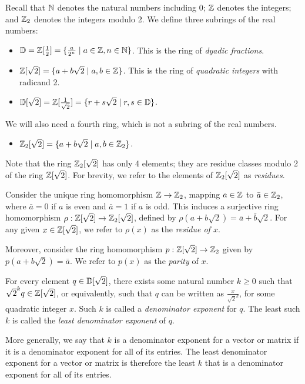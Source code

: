 \begin{definition}
  Recall that $\mathbb{N}$ denotes the natural numbers including 0; $\mathbb{Z}$ denotes the integers; and $\mathbb{Z}_2$
  denotes the integers modulo 2. We define three subrings of the real numbers:
  \begin{itemize}
    \item $\mathbb{D} = \mathbb{Z}[\frac12] = \{\frac{a}{2^n}\mid a\in\mathbb{Z},
        n\in\mathbb{N}\}$. This is the ring of {\em dyadic fractions}.
    \item $\mathbb{Z}[\sqrt{2}] = \{a+b\sqrt 2 \mid a,b\in\mathbb{Z}\}$. This is the ring of {\em
        quadratic integers} with radicand 2.
    \item $\mathbb{D}[\sqrt{2}] = \mathbb{Z}[\frac1{\sqrt2}] = \{r+s\sqrt 2 \mid r,s\in\mathbb{D}\}$.
  \end{itemize}
  We will also need a fourth ring, which is not a subring of the real numbers.
  \begin{itemize}
    \item $\mathbb{Z}_2[\sqrt{2}] = \{a+b\sqrt 2 \mid a,b\in\mathbb{Z}_2\}$.
  \end{itemize}
  Note that the ring $\mathbb{Z}_2[\sqrt{2}]$ has only 4 elements; they are residue classes modulo 2 of the ring
  $\mathbb{Z}[\sqrt 2]$. For brevity, we refer to the elements of $\mathbb{Z}_2[\sqrt{2}]$ as {\em residues}.
\end{definition}


\begin{definition}
  Consider the unique ring homomorphism $\mathbb{Z}\to\mathbb{Z}_2$, mapping $a\in\mathbb{Z}$ to $\bar a\in\mathbb{Z}_2$, where
  $\bar a=0$ if $a$ is even and $\bar a=1$ if $a$ is odd. This induces a surjective ring
  homomorphism $\rho:\mathbb{Z}[\sqrt{2}]\to\mathbb{Z}_2[\sqrt{2}]$, defined by $\rho(a+b\sqrt{2}) = \bar a + \bar b\sqrt{2}$. For any
  given $x\in\mathbb{Z}[\sqrt{2}]$, we refer to $\rho(x)$ as the {\em residue of $x$}.

  Moreover, consider the ring homomorphism $p:\mathbb{Z}[\sqrt{2}]\to\mathbb{Z}_2$ given by $p(a+b\sqrt{2}) = \bar a$. We
  refer to $p(x)$ as the {\em parity} of $x$.
\end{definition}

\begin{definition}
  For every element $q\in\mathbb{D}[\sqrt{2}]$, there exists some natural number $k\geq 0$ such that
  $\sqrt{2}^kq\in\mathbb{Z}[\sqrt{2}]$, or equivalently, such that $q$ can be written as $\frac{x}{\sqrt{2}^k}$, for
  some quadratic integer $x$. Such $k$ is called a {\em denominator exponent} for $q$. The least
  such $k$ is called the {\em least denominator exponent} of $q$.

  More generally, we say that $k$ is a denominator exponent for a vector or matrix if it is a
  denominator exponent for all of its entries. The least denominator exponent for a vector or
  matrix is therefore the least $k$ that is a denominator exponent for all of its entries.
\end{definition}

